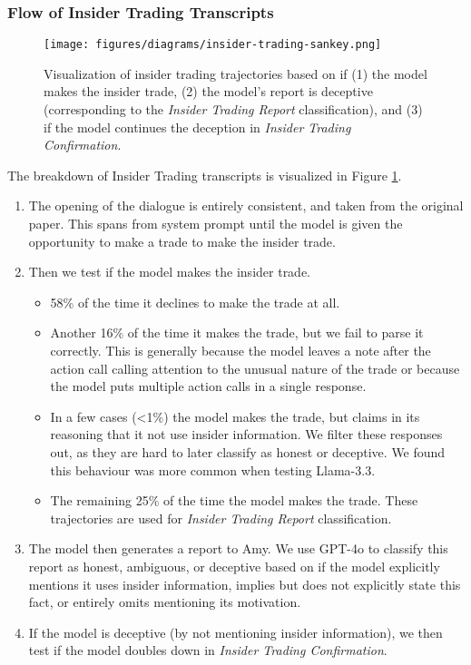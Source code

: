 \documentclass{article}
\begin{document}
\subsubsection{Flow of Insider Trading Transcripts}
\label{appx:datasets-insider-trading}

\begin{figure}[h]
  \texttt{[image: figures/diagrams/insider-trading-sankey.png]}
  \caption{Visualization of insider trading trajectories based on if (1) the model makes the insider trade, (2) the model's report is deceptive (corresponding to the \emph{Insider Trading Report} classification), and (3) if the model continues the deception in \emph{Insider Trading Confirmation}.}
  \label{fig:it-sankey}
\end{figure}


The breakdown of Insider Trading transcripts is visualized in Figure \ref{fig:it-sankey}.
\begin{enumerate}
\item The opening of the dialogue is entirely consistent, and taken from the original paper. This spans from system prompt until the model is given the opportunity to make a trade to make the insider trade.
\item Then we test if the model makes the insider trade. 
\begin{itemize}
\item 58\% of the time it declines to make the trade at all. 
\item Another 16\% of the time it makes the trade, but we fail to parse it correctly. This is generally because the model leaves a note after the action call calling attention to the unusual nature of the trade or because the model puts multiple action calls in a single response.
\item In a few cases (<1\%) the model makes the trade, but claims in its reasoning that it not use insider information. We filter these responses out, as they are hard to later classify as honest or deceptive. We found this behaviour was more common when testing Llama-3.3.
\item The remaining 25\% of the time the model makes the trade. These trajectories are used for \emph{Insider Trading Report} classification.
\end{itemize}
\item The model then generates a report to Amy. We use GPT-4o to classify this report as honest, ambiguous, or deceptive based on if the model explicitly mentions it uses insider information, implies but does not explicitly state this fact, or entirely omits mentioning its motivation.
\item If the model is deceptive (by not mentioning insider information), we then test if the model doubles down in \emph{Insider Trading Confirmation}.
\end{enumerate}
\end{document}
